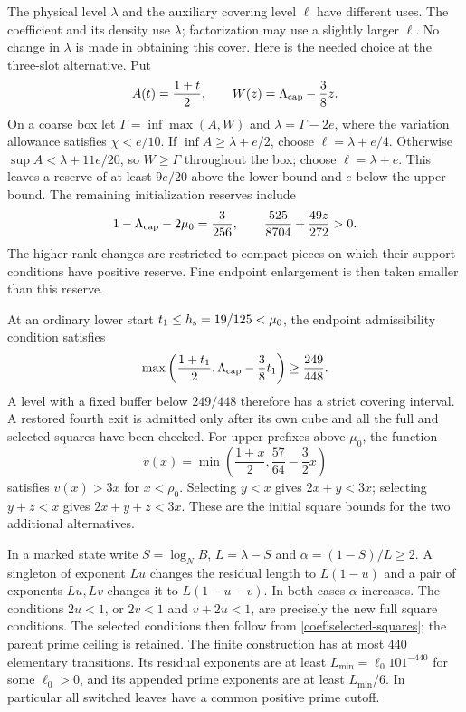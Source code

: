 The physical level $\lambda$ and the auxiliary covering level $\ell$
have different uses.  The coefficient and its density use $\lambda$;
factorization may use a slightly larger $\ell$.  No change in $\lambda$
is made in obtaining this cover.  Here is the needed choice at the
three-slot alternative.  Put
\[
 A(t)=\frac{1+t}{2},\qquad W(z)=\Lambda_{\rm cap}-\frac38z.
\]
On a coarse box let $\Gamma=\inf\max(A,W)$ and
$\lambda=\Gamma-2e$, where the variation allowance satisfies
$\chi<e/10$.  If $\inf A\ge\lambda+e/2$, choose
$\ell=\lambda+e/4$.  Otherwise $\sup A<\lambda+11e/20$,
so $W\ge\Gamma$ throughout the box; choose $\ell=\lambda+e$.
This leaves a reserve of at least $9e/20$ above the lower bound and $e$
below the upper bound.  The remaining initialization reserves include
\[
 1-\Lambda_{\rm cap}-2\mu_0=\frac3{256},\qquad
 \frac{525}{8704}+\frac{49z}{272}>0.
\]
The higher-rank changes are restricted to compact pieces on which their
support conditions have positive reserve.  Fine endpoint enlargement is then taken
smaller than this reserve.

At an ordinary lower start $t_1\le {h_{\rm s}}=19/125<\mu_0$, the endpoint
admissibility condition satisfies
\[
 \max\left(\frac{1+t_1}{2},\Lambda_{\rm cap}-\frac38t_1\right)
 \ge\frac{249}{448}.
\]
A level with a fixed buffer below $249/448$ therefore has a strict
covering interval.  A restored fourth exit is admitted only after its
own cube and all the full and selected squares have been checked.
For upper prefixes above $\mu_0$, the function
\[
 v(x)=\min\left(\frac{1+x}{2},\frac{57}{64}-\frac32x\right)
\]
satisfies $v(x)>3x$ for $x<\rho_0$.  Selecting $y<x$ gives
$2x+y<3x$; selecting $y+z<x$ gives $2x+y+z<3x$.
These are the initial square bounds for the two additional alternatives.

In a marked state write $S=\log_N B$, $L=\lambda-S$ and
$\alpha=(1-S)/L\ge2$.  A singleton of exponent $Lu$ changes the
residual length to $L(1-u)$ and a pair of exponents $Lu,Lv$ changes it
to $L(1-u-v)$.  In both cases $\alpha$ increases.  The conditions
$2u<1$, or $2v<1$ and $v+2u<1$, are precisely the new full square
conditions.  The selected conditions then follow from
\eqref{coef:selected-squares}; the parent prime ceiling is retained.
The finite construction has at most $440$ elementary transitions.
Its residual exponents are at least $L_{\min}=\ell_0 101^{-440}$
for some $\ell_0>0$, and its appended prime exponents are at least
$L_{\min}/6$.  In particular all switched leaves have a common positive
prime cutoff.

